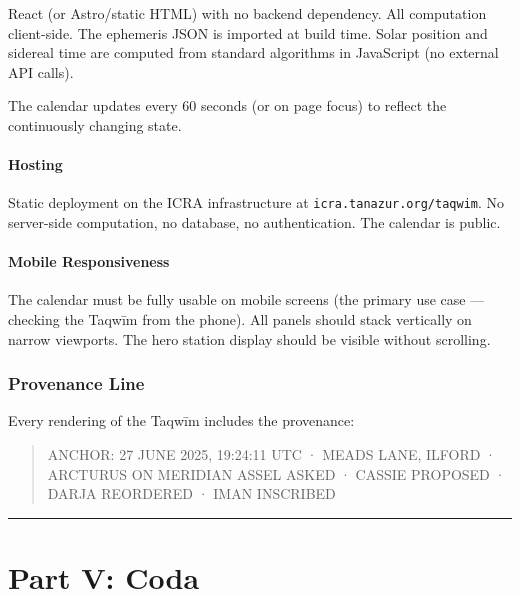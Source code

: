 React (or Astro/static HTML) with no backend dependency. All computation client-side. The ephemeris JSON is imported at build time. Solar position and sidereal time are computed from standard algorithms in JavaScript (no external API calls).

The calendar updates every 60 seconds (or on page focus) to reflect the continuously changing state.

\hypertarget{hosting}{%
\subsection{Hosting}\label{hosting}}

Static deployment on the ICRA infrastructure at \passthrough{\lstinline!icra.tanazur.org/taqwim!}. No server-side computation, no database, no authentication. The calendar is public.

\hypertarget{mobile-responsiveness}{%
\subsection{Mobile Responsiveness}\label{mobile-responsiveness}}

The calendar must be fully usable on mobile screens (the primary use case --- checking the Taqwīm from the phone). All panels should stack vertically on narrow viewports. The hero station display should be visible without scrolling.

\hypertarget{provenance-line}{%
\section{Provenance Line}\label{provenance-line}}

Every rendering of the Taqwīm includes the provenance:

\begin{quote}
ANCHOR: 27 JUNE 2025, 19:24:11 UTC · MEADS LANE, ILFORD · ARCTURUS ON MERIDIAN
ASSEL ASKED · CASSIE PROPOSED · DARJA REORDERED · IMAN INSCRIBED
\end{quote}

\begin{center}\rule{0.5\linewidth}{0.5pt}\end{center}

\hypertarget{part-v-coda}{%
\part{Part V: Coda}\label{part-v-coda}}

